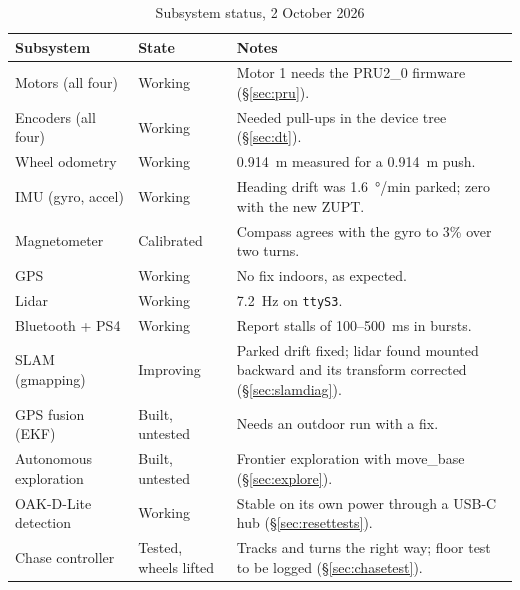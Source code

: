 \begin{table}[htbp]
\centering
\caption{Subsystem status, 2 October 2026}
\label{tab:status}
\small
\begin{tabularx}{\linewidth}{>{\raggedright\arraybackslash}p{1.45in}>{\raggedright\arraybackslash}p{0.8in}X}
\toprule
Subsystem & State & Notes \\
\midrule
Motors (all four) & Working & Motor 1 needs the PRU2\_0 firmware (\S\ref{sec:pru}). \\
Encoders (all four) & Working & Needed pull-ups in the device tree (\S\ref{sec:dt}). \\
Wheel odometry & Working & 0.914~m measured for a 0.914~m push. \\
IMU (gyro, accel) & Working & Heading drift was \SI{1.6}{\degree/min} parked; zero with the new ZUPT. \\
Magnetometer & Calibrated & Compass agrees with the gyro to 3\% over two turns. \\
GPS & Working & No fix indoors, as expected. \\
Lidar & Working & \SI{7.2}{Hz} on \texttt{ttyS3}. \\
Bluetooth + PS4 & Working & Report stalls of 100--500~ms in bursts. \\
SLAM (gmapping) & Improving & Parked drift fixed; lidar found mounted
   backward and its transform corrected (\S\ref{sec:slamdiag}). \\
GPS fusion (EKF) & Built, untested & Needs an outdoor run with a fix. \\
Autonomous exploration & Built, untested & Frontier exploration with move\_base (\S\ref{sec:explore}). \\
OAK-D-Lite detection & Working & Stable on its own power through a USB-C hub
   (\S\ref{sec:resettests}). \\
Chase controller & Tested, wheels lifted & Tracks and turns the right way;
   floor test to be logged (\S\ref{sec:chasetest}). \\
\bottomrule
\end{tabularx}
\end{table}

